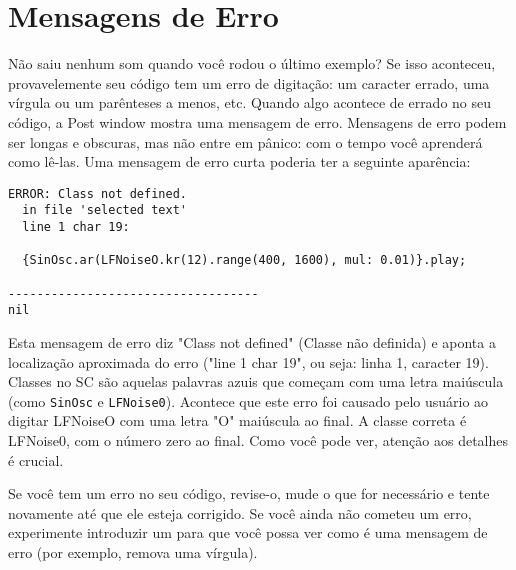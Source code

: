 \section{Mensagens de Erro}

Não saiu nenhum som quando você rodou o último exemplo? Se isso aconteceu, provavelemente seu código tem um erro de digitação: um caracter errado, uma vírgula ou um parênteses a menos, etc. Quando algo acontece de errado no seu código, a Post window mostra uma mensagem de erro. Mensagens de erro podem ser longas e obscuras, mas não entre em pânico: com o tempo você aprenderá como lê-las. Uma mensagem de erro curta poderia ter a seguinte aparência:

\begin{verbatim}
ERROR: Class not defined.
  in file 'selected text'
  line 1 char 19:

  {SinOsc.ar(LFNoiseO.kr(12).range(400, 1600), mul: 0.01)}.play; 
                     
-----------------------------------
nil
\end{verbatim}

Esta mensagem de erro diz "Class not defined" (Classe não definida) e aponta a localização aproximada do erro ("line 1 char 19", ou seja: linha 1, caracter 19). Classes no SC são aquelas palavras azuis que começam com uma letra maiúscula (como \texttt{SinOsc} e \texttt{LFNoise0}). Acontece que este erro foi causado pelo usuário ao digitar LFNoiseO com uma letra "O" maiúscula ao final. A classe correta é LFNoise0, com o número zero ao final. Como você pode ver, atenção aos detalhes é crucial.

Se você tem um erro no seu código, revise-o, mude o que for necessário e tente novamente até que ele esteja corrigido. Se você ainda não cometeu um erro, experimente introduzir um para que você possa ver como é uma mensagem de erro (por exemplo, remova uma vírgula).

\bigskip
{}
